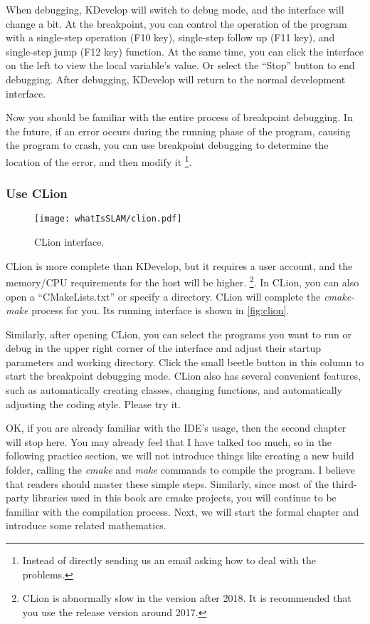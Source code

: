 When debugging, KDevelop will switch to debug mode, and the interface will change a bit. At the breakpoint, you can control the operation of the program with a single-step operation (F10 key), single-step follow up (F11 key), and single-step jump (F12 key) function. At the same time, you can click the interface on the left to view the local variable's value. Or select the ``Stop'' button to end debugging. After debugging, KDevelop will return to the normal development interface.

Now you should be familiar with the entire process of breakpoint debugging. In the future, if an error occurs during the running phase of the program, causing the program to crash, you can use breakpoint debugging to determine the location of the error, and then modify it \footnote{Instead of directly sending us an email asking how to deal with the problems. }.

\subsubsection{Use CLion}
\begin{figure}[!t]
    \centering
    \texttt{[image: whatIsSLAM/clion.pdf]}
    \caption{CLion interface.}
    \label{fig:clion}
\end{figure}

CLion is more complete than KDevelop, but it requires a user account, and the memory/CPU requirements for the host will be higher. \footnote{CLion is abnormally slow in the version after 2018. It is recommended that you use the release version around 2017. }. In CLion, you can also open a ``CMakeLists.txt'' or specify a directory. CLion will complete the \textit{cmake-make} process for you. Its running interface is shown in \autoref{fig:clion}.

Similarly, after opening CLion, you can select the programs you want to run or debug in the upper right corner of the interface and adjust their startup parameters and working directory. Click the small beetle button in this column to start the breakpoint debugging mode. CLion also has several convenient features, such as automatically creating classes, changing functions, and automatically adjusting the coding style. Please try it.

OK, if you are already familiar with the IDE's usage, then the second chapter will stop here. You may already feel that I have talked too much, so in the following practice section, we will not introduce things like creating a new build folder, calling the \textit{cmake} and \textit{make} commands to compile the program. I believe that readers should master these simple steps. Similarly, since most of the third-party libraries used in this book are cmake projects, you will continue to be familiar with the compilation process. Next, we will start the formal chapter and introduce some related mathematics.

